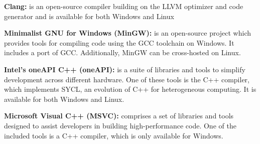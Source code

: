 
\noindent\textbf{Clang:} is an open-source compiler building on the LLVM optimizer and code generator and is available for both Windows and Linux\cite{clang}\newline

\noindent\textbf{Minimalist GNU for Windows (MinGW):} is an open-source project which provides tools for compiling code using the GCC toolchain on Windows. It includes a port of GCC. Additionally, MinGW can be cross-hosted on Linux.\cite{mingw}\newline

\noindent\textbf{Intel's oneAPI C++ (oneAPI):} is a suite of libraries and tools to simplify development across different hardware. One of these tools is the C++ compiler, which implements SYCL, an evolution of C++ for heterogeneous computing. It is available for both Windows and Linux.\cite{oneapi}\newline


\noindent\textbf{Microsoft Visual C++ (MSVC):}  comprises a set of libraries and tools designed to assist developers in building high-performance code. One of the included tools is a C++ compiler, which is only available for Windows\cite{msvc}.\newline
